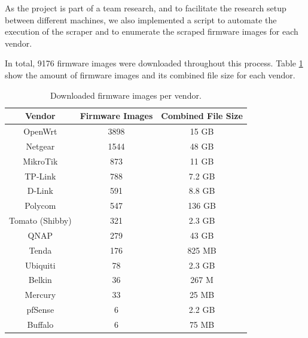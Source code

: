 As the project is part of a team research, and to facilitate the research setup between different machines, we also implemented a script to automate the execution of the scraper and to enumerate the scraped firmware images for each vendor.

In total, 9176 firmware images were downloaded throughout this process. Table \ref{tab:scraper} show the amount of firmware images and its combined file size for each vendor.

\begin{table}[h]
\centering
\caption{Downloaded firmware images per vendor.}
\begin{tabular}{ccc}
\hline
\textbf{Vendor} & \textbf{Firmware Images} & \textbf{Combined File Size} \\ \hline
OpenWrt         & 3898                     & 15 GB                       \\ 
Netgear         & 1544                     & 48 GB                       \\ 
MikroTik        & 873                      & 11 GB                       \\ 
TP-Link         & 788                      & 7.2 GB                      \\ 
D-Link          & 591                      & 8.8 GB                      \\ 
Polycom         & 547                      & 136 GB                      \\ 
Tomato (Shibby) & 321                      & 2.3 GB                      \\ 
QNAP            & 279                      & 43 GB                       \\ 
Tenda           & 176                      & 825 MB                      \\ 
Ubiquiti        & 78                       & 2.3 GB                      \\ 
Belkin          & 36                       & 267 M                       \\ 
Mercury         & 33                       & 25 MB                       \\ 
pfSense         & 6                        & 2.2 GB                      \\ 
Buffalo         & 6                        & 75 MB                       \\ \hline

\end{tabular}
\label{tab:scraper}
\end{table}

